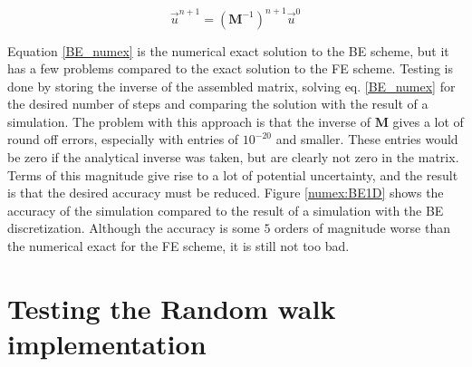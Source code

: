 \begin{equation}\label{BE_numex}
 \vec u^{n+1} = \left(\mathbf M^{-1}\right)^{n+1} \vec u^0
\end{equation}

Equation \eqref{BE_numex} is the numerical exact solution to the BE scheme, but it has a few problems compared to the exact solution to the FE scheme. 
Testing is done by storing the inverse of the assembled matrix, solving eq. \eqref{BE_numex} for the desired number of steps and comparing the solution with the result of a simulation. 
The problem with this approach is that the inverse of $\mathbf M$ gives a lot of round off errors, especially with entries of $10^{-20}$ and smaller. 
These entries would be zero if the analytical inverse was taken, but are clearly not zero in the matrix. 
Terms of this magnitude give rise to a lot of potential uncertainty, and the result is that the desired accuracy must be reduced. 
Figure \ref{numex:BE1D} shows the accuracy of the simulation compared to the result of a simulation with the BE discretization. 
Although the accuracy is some $5$ orders of magnitude worse than the numerical exact for the FE scheme, it is still not too bad. 





\section{Testing the Random walk implementation}\label{testing_random_walks}



